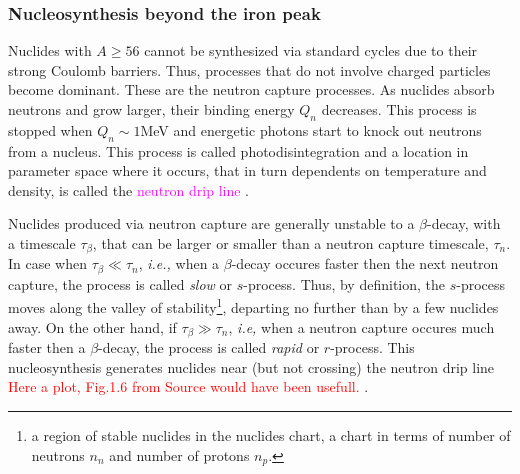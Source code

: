 \documentclass[11pt,a4paper,headinclude=true,DIV=14,BCOR=8mm,chapterprefix,listof=totoc,twoside,openright,abstracton]{scrbook}
\newcommand{\magenta}[1]{\textcolor{magenta}{#1}} %
\begin{document}

\subsubsection{Nucleosynthesis beyond the iron peak}

Nuclides with $A\geq 56$ cannot be synthesized via standard cycles due to their strong Coulomb barriers. Thus, processes that do not involve charged particles become dominant. These are the neutron capture processes.
As nuclides absorb neutrons and grow larger, their binding energy $Q_n$ decreases. This process is stopped when $Q_n\sim1$MeV and energetic photons start to knock out neutrons from a nucleus. This process is called photodisintegration and a location in parameter space where it occurs, that in turn dependents on temperature and density, is called the \magenta{neutron drip line} \cite{Rolfs:1988}.

Nuclides produced via neutron capture are generally unstable to a $\beta$-decay, with a timescale $\tau_{\beta}$, that can be larger or smaller than a neutron capture timescale, $\tau_n$. 
In case when $\tau_{\beta}\ll\tau_n$, \textit{i.e.,} when a $\beta$-decay occures faster then the next neutron capture, the process is called \textit{slow} or $s$-process. 
Thus, by definition, the $s$-process moves along the valley of stability\footnote{a region of stable nuclides in the nuclides chart, a chart in terms of number of neutrons $n_n$ and number of protons $n_p$.}, departing no further than by a few nuclides away.
On the other hand, if $\tau_{\beta}\gg\tau_n$, \textit{i.e,} when a neutron capture occures much faster then a $\beta$-decay, the process is called \textit{rapid} or $r$-process. This nucleosynthesis generates nuclides near (but not crossing) the neutron drip line \textcolor{red}{Here a plot, Fig.1.6 from Source would have been usefull.} \cite{Rolfs:1988}. 
\end{document}
